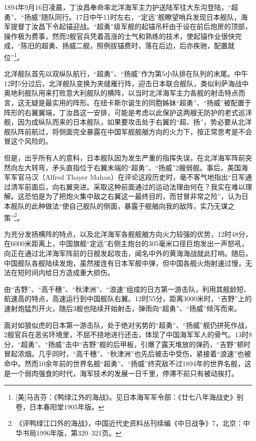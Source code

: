 \documentclass[12pt,UTF8]{ctexbook}
\begin{document}
1894年9月16日凌晨，丁汝昌奉命率北洋海军主力护送陆军往大东沟登陆，“超勇”、“扬威”随队同行。17日中午11时左右，“定远”舰瞭望哨兵发现日本舰队，海军提督丁汝昌下令起锚迎战。“超勇”级军舰的起锚吊杆由于设在前后炮房的顶部，操作极为费事，然而2舰官兵凭着高涨的士气和熟练的技术，使起锚作业很快完成，“陈旧的超勇、扬威二舰，照例拔锚费时，落在后边，后亦疾驰，配置就位”\footnote{[美]马吉芬：《鸭绿江外的海战》。见日本海军军令部：《廿七八年海战史》别卷，日本春阳堂1905年版。}。

北洋舰队首先以双纵队航行，“超勇”、“扬威”作为第5小队排在队列的末尾。中午12时5分过后，北洋舰队变换为夹缝雁行阵，迎击日本联合舰队，类似利萨海战中奥地利舰队用来打败意大利舰队的横阵，以当时北洋海军主力各舰的射击特点而言，这无疑是最实用的阵形。在纽卡斯尔诞生的同胞姊妹“超勇”、“扬威”被配置于阵形的右翼翼端，丁汝昌这一安排，可能是考虑以此保护这两艘无防护的老式巡洋舰，因为成纵队而来的日本舰队，如果要攻击处于右翼的“超、扬”，势必要从北洋舰队阵前航过，将侧面完全暴露在中国军舰舰艏方向的火力下，按正常思考是不会冒这个风险的。

但是，出乎所有人的意料，日本舰队因为发生严重的指挥失误，在北洋海军阵前突然向左大转弯，矛头直指位于右翼末端的“超勇”、“扬威”2艘弱舰。事后，美国海军军官马汉（Alfred Thayer Mahan）在评论这段历史时，毫不客气地指出“日军通过清军前面后，向右翼突进。采取这种前面通过的运动法理由何在？我实在难以理解。这恐怕是为了把炮火集中敌之右翼这一最终目的，而甘冒非常之险”，认为日本舰队的此种做法“使自己舰队的侧面，暴露于舰艏向我的敌阵，实乃无谋之策”\footnote{《评鸭绿江口外的海战》，中国近代史资料丛刊续编《中日战争》7，北京：中华书局1996年版，第320--321页。}。

为充分发扬横阵的特点，以及北洋海军各舰舰艏方向火力较强的优势，12时48分，在6000米距离上，中国旗舰“定远”右侧主炮台的305毫米口径巨炮发出一声怒吼，向正在通过北洋海军阵前的日舰发起攻击，闻名中外的黄海海战就此打响。随后，中国舰队各舰陆续发炮，虽然接连有日本军舰中弹，但中国各舰火炮射速过慢，无法在短时间内给日方造成重大损伤。

由“吉野”、“高千穗”、“秋津洲”、“浪速”组成的日方第一游击队，利用其舰龄短、航速高的特点，高速运行到中国舰队右翼。12时55分，距离3000米时，“吉野”上的速射炮猛烈开火，随后3舰也陆续开始射击，弹雨向“超勇”、“扬威”倾泻而来。

面对如狼似虎的日本第一游击队，处于绝对劣势的“超勇”、“扬威”舰仍拼死作战，2舰官兵在恶劣环境里，不屈不挠地进行还击，体现了中国海军军人的骨气。13时8分，“超勇”、“扬威”击中“吉野”舰的后甲板，引爆了露天堆放的弹药，“吉野”顿时冒起浓烟。几乎同时，“高千穗”、“秋津洲”也先后被击中受伤，紧接着“浪速”也被命中。然而10余年前的世界名舰“超勇”、“扬威”终究敌不过1894年的世界名舰，这是一个弱肉强食的时代，海军技术的发展一日千里，停滞不前只有被动挨打。
\end{document}
